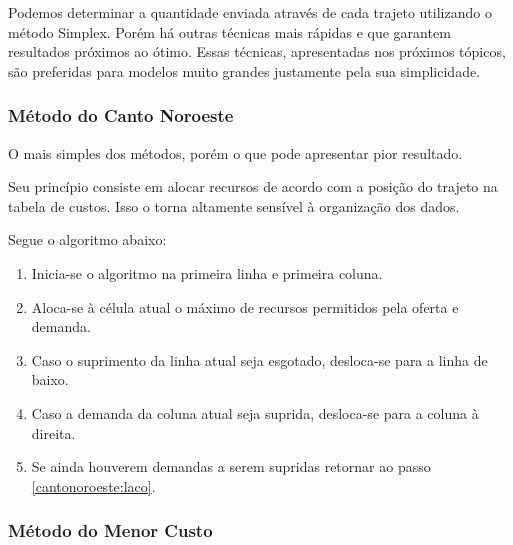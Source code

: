 \documentclass [11pt]{articleSBPO}
\begin{document}
Podemos determinar a quantidade enviada através de cada trajeto utilizando o método Simplex. Porém há outras técnicas mais rápidas e que garantem resultados próximos ao ótimo. Essas técnicas, apresentadas nos próximos tópicos, são preferidas para modelos muito grandes justamente pela sua simplicidade.

%
%

\subsubsection{Método do Canto Noroeste}\label{subsubsec:noroeste}

O mais simples dos métodos, porém o que pode apresentar pior resultado.

Seu princípio consiste em alocar recursos de acordo com a posição do trajeto na tabela de custos. Isso o torna altamente sensível à organização dos dados.

Segue o algoritmo abaixo:

\begin{enumerate}
	\item Inicia-se o algoritmo na primeira linha e primeira coluna.
	\item Aloca-se à célula atual o máximo de recursos permitidos pela oferta e demanda. \label{cantonoroeste:laco}
	\item Caso o suprimento da linha atual seja esgotado, desloca-se para a linha de baixo.
	\item Caso a demanda da coluna atual seja suprida, desloca-se para a coluna à direita.
	\item Se ainda houverem demandas a serem supridas retornar ao passo \ref{cantonoroeste:laco}.
\end{enumerate}

\subsubsection{Método do Menor Custo}\label{subsubsec:menorcusto}
\end{document}
